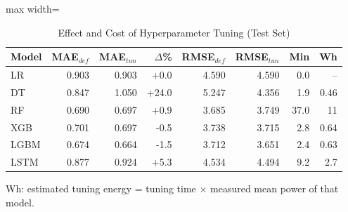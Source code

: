 \begin{table}[!htb]
\centering
\caption{Effect and Cost of Hyperparameter Tuning (Test Set)}
\label{tab:tuning}
\footnotesize
\setlength{\tabcolsep}{4pt}
\begin{adjustbox}{max width=\columnwidth}
\begin{tabular}{lrrrrrrr}
\toprule
Model & MAE$_{def}$ & MAE$_{tun}$ & $\Delta$\% & RMSE$_{def}$ & RMSE$_{tun}$ & Min & Wh \\
\midrule
LR & 0.903 & 0.903 & +0.0 & 4.590 & 4.590 & 0.0 & -- \\
DT & 0.847 & 1.050 & +24.0 & 5.247 & 4.356 & 1.9 & 0.46 \\
RF & 0.690 & 0.697 & +0.9 & 3.685 & 3.749 & 37.0 & 11 \\
XGB & 0.701 & 0.697 & -0.5 & 3.738 & 3.715 & 2.8 & 0.64 \\
LGBM & 0.674 & 0.664 & -1.5 & 3.712 & 3.651 & 2.4 & 0.63 \\
LSTM & 0.877 & 0.924 & +5.3 & 4.534 & 4.494 & 9.2 & 2.7 \\
\bottomrule
\end{tabular}
\end{adjustbox}
\par\vspace{3pt}
{\scriptsize Wh: estimated tuning energy = tuning time $\times$ measured mean power of that model.\par}
\end{table}
